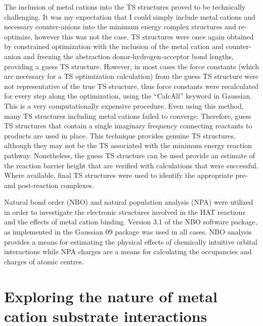 The inclusion of metal cations into the TS structures proved to be technically
challenging. It was my expectation that I could simply include metal cations and
necessary counter-anions into the minimum energy complex structures and
re-optimize, however this was not the case. TS structures were once again
obtained by constrained optimization with the inclusion of the metal cation and
counter-anion and freezing the abstraction donor-hydrogen-acceptor bond lengths,
providing a guess TS structure. However, in most cases the force constants
(which are necessary for a TS optimization calculation) from the guess TS
structure were not representative of the true TS structure, thus force constants
were recalculated for every step along the optimization, using the ``CalcAll''
keyword in Gaussian. This is a very computationally expensive procedure. Even
using this method, many TS structures including metal cations failed to
converge. Therefore, guess TS structures that contain a single imaginary
frequency connecting reactants to products are used in place. This technique
provides genuine TS structures, although they may not be the TS associated with
the minimum energy reaction pathway. Nonetheless, the guess TS structure can be
used provide an estimate of the reaction barrier height that are verified with
calculations that were successful. Where available, final TS structures were
used to identify the appropriate pre- and post-reaction complexes.

Natural bond order (NBO) and natural population analysis (NPA) were utilized in
order to investigate the electronic structures involved in the HAT reactions and
the effects of metal cation binding.\cite{Reed1983, Reed1985, Glendening2012}
Version 3.1 of the NBO software package,\cite{NBO3} as implemented in the
Gaussian 09 package was used in all cases.\cite{Frisch2009} NBO analysis
provides a means for estimating the physical effects of chemically intuitive
orbital interactions while NPA charges are a means for calculating the
occupancies and charges of atomic centres.\cite{Landis2014, Weinhold2016}

\section{Exploring the nature of metal cation substrate interactions}

